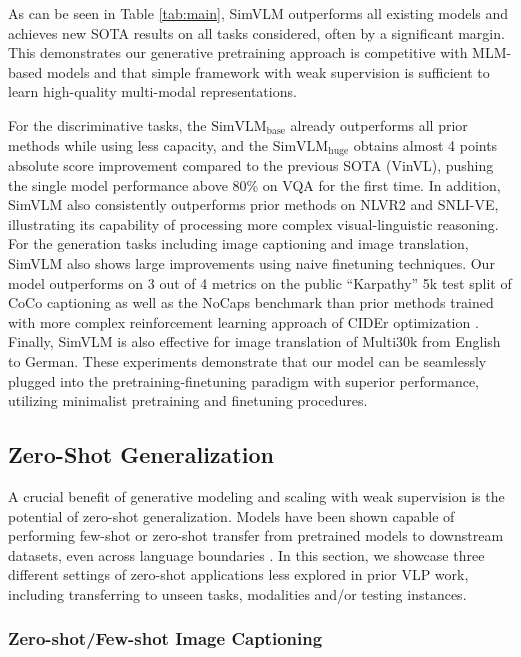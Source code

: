 As can be seen in Table \ref{tab:main}, {SimVLM} outperforms all existing models and achieves new SOTA results on all tasks considered, often by a significant margin. This demonstrates our generative pretraining approach is competitive with MLM-based models and that simple framework with weak supervision is sufficient to learn high-quality multi-modal representations.

For the discriminative tasks, the $\text{SimVLM}_{\text{base}}$ already outperforms all prior methods while using less capacity, and the $\text{SimVLM}_{\text{huge}}$ obtains almost 4 points absolute score improvement compared to the previous SOTA (VinVL), pushing the single model performance above 80\% on VQA for the first time. In addition, {SimVLM} also consistently outperforms prior methods on NLVR2 and SNLI-VE, illustrating its capability of processing more complex visual-linguistic reasoning. For the generation tasks including image captioning and image translation, {SimVLM} also shows large improvements using naive finetuning techniques. Our model outperforms on 3 out of 4 metrics on the public ``Karpathy'' 5k test split of CoCo captioning as well as the NoCaps benchmark than prior methods trained with more complex reinforcement learning approach of CIDEr optimization \citep{rennie2017self}. Finally, {SimVLM} is also effective for image translation of Multi30k from English to German. These experiments demonstrate that our model can be seamlessly plugged into the pretraining-finetuning paradigm with superior performance, utilizing minimalist pretraining and finetuning procedures.

\subsection{Zero-Shot Generalization}

A crucial benefit of generative modeling and scaling with weak supervision is the potential of zero-shot generalization. Models \citep{brown2020language,radford2021learning,jia2021scaling} have been shown capable of performing few-shot or zero-shot transfer from pretrained models to downstream datasets, even across language boundaries \citep{lample2019cross}. In this section, we showcase three different settings of zero-shot applications less explored in prior VLP work, including transferring to unseen tasks, modalities and/or testing instances.

\subsubsection{Zero-shot/Few-shot Image Captioning}

